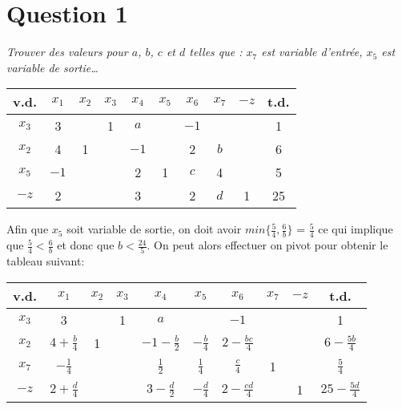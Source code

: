 \section*{Question 1}

\emph{Trouver des valeurs pour $a$, $b$, $c$ et $d$ telles que : $x_7$ est variable d’entrée, $x_5$ est variable de sortie\dots}
\begin{center}
	\renewcommand{\arraystretch}{1.5}
	\begin{tabular}{|c|cccccccc|c|}
		\hline
		v.d.  & $x_1$ & $x_2$ & $x_3$ & $x_4$ & $x_5$ & $x_6$ & $x_7$ & $-z$ & t.d. \\ \hline
		$x_3$ &   3   &       &   1   &  $a$  &       & $-1$  &       &      &  1   \\
		$x_2$ &   4   &   1   &       & $-1$  &       &   2   &  $b$  &      &  6   \\
		$x_5$ & $-1$  &       &       &   2   &   1   &  $c$  &   4   &      &  5   \\ \hline
		$-z$  &   2   &       &       &   3   &       &   2   &  $d$  &  1   &  25  \\ \hline
	\end{tabular}
\end{center}

Afin que $x_5$ soit variable de sortie, on doit avoir $min \{\frac{5}{4}, \frac{6}{b}\}$ = $\frac{5}{4}$ ce qui implique que $\frac{5}{4} < \frac{6}{b}$ et donc que $b < \frac{24}{5}$. On peut alors effectuer on pivot pour obtenir le tableau suivant:

\begin{center}
	\renewcommand{\arraystretch}{1.5}
	\begin{tabular}{|c|cccccccc|c|}
		\hline
		v.d.  &      $x_1$      & $x_2$ & $x_3$ &      $x_4$       &     $x_5$      &      $x_6$       & $x_7$ & $-z$ &       t.d.        \\ \hline
		$x_3$ &        3        &       &   1   &       $a$        &                &        $-1$        &       &      &         1         \\
		$x_2$ & $4+\frac{b}{4}$ &   1   &       & $-1-\frac{b}{2}$ & $-\frac{b}{4}$ & $2-\frac{bc}{4}$ &       &      & $6-\frac{5b}{4}$  \\
		$x_7$ & $-\frac{1}{4}$  &       &       &  $\frac{1}{2}$   & $\frac{1}{4}$  &  $\frac{c}{4}$   &   1   &      &   $\frac{5}{4}$   \\ \hline
		$-z$  & $2+\frac{d}{4}$ &       &       & $3-\frac{d}{2}$  & $-\frac{d}{4}$ & $2-\frac{cd}{4}$ &       &  1   & $25-\frac{5d}{4}$ \\ \hline
	\end{tabular}
\end{center}

